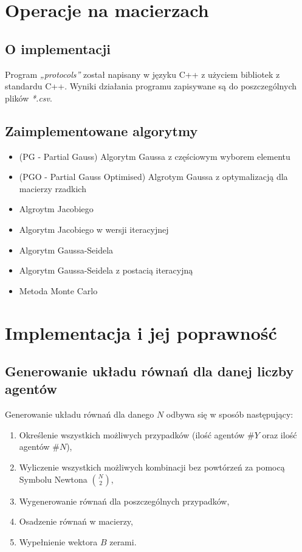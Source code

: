 \maketitle
\section {Operacje na macierzach}
\subsection{O implementacji}
Program \textit{„protocols”} został napisany w języku C++ z użyciem bibliotek z standardu C++. 
Wyniki działania programu zapisywane są do poszczególnych plików \textit{*.csv}.
\subsection{Zaimplementowane algorytmy}
\begin{itemize}
	\item (PG - Partial Gauss) Algorytm Gaussa z częściowym wyborem elementu
	\item (PGO - Partial Gauss Optimised) Algrotym Gaussa z optymalizacją dla macierzy rzadkich
	\item Algroytm Jacobiego
	\item Algorytm Jacobiego w wersji iteracyjnej
	\item Algorytm Gaussa-Seidela
	\item Algorytm Gaussa-Seidela z postacią iteracyjną
	\item Metoda Monte Carlo
\end{itemize}

\section{Implementacja i jej poprawność}
\subsection{Generowanie układu równań dla danej liczby agentów}
Generowanie układu równań dla danego $N$ odbywa się w sposób następujący:
\begin{enumerate}
	\item Określenie wszystkich możliwych przypadków (ilość agentów $\#Y$ oraz ilość agentów $\#N$),
	\item Wyliczenie wszystkich możliwych kombinacji bez powtórzeń za pomocą Symbolu Newtona ${{N} \choose {2}}$,
	\item Wygenerowanie równań dla poszczególnych przypadków,
	\item Osadzenie równań w macierzy,
	\item Wypełnienie wektora $B$ zerami.
\end{enumerate}
